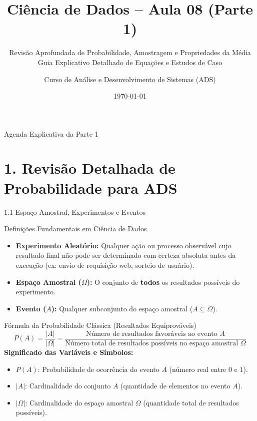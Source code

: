 \documentclass[10pt, aspectratio=169]{beamer}
\title[Ciência de Dados: Probabilidade e Média]{Ciência de Dados -- Aula 08 (Parte 1)}
\subtitle{Revisão Aprofundada de Probabilidade, Amostragem e Propriedades da Média\\{\small Guia Explicativo Detalhado de Equações e Estudos de Caso}}
\author[ADS]{Curso de Análise e Desenvolvimento de Sistemas (ADS)}
\institute[ADS]{Disciplina: Ciência de Dados}
\date{\today}
\begin{document}
\begin{frame}
    \titlepage
\end{frame}

\begin{frame}{Agenda Explicativa da Parte 1}
    \tableofcontents
\end{frame}

\section{1. Revisão Detalhada de Probabilidade para ADS}

\begin{frame}{1.1 Espaço Amostral, Experimentos e Eventos}
    \begin{block}{Definições Fundamentais em Ciência de Dados}
        \begin{itemize}
            \item \textbf{Experimento Aleatório:} Qualquer ação ou processo observável cujo resultado final não pode ser determinado com certeza absoluta antes da execução (ex: envio de requisição web, sorteio de usuário).
            \item \textbf{Espaço Amostral ($\Omega$):} O conjunto de \textbf{todos} os resultados possíveis do experimento.
            \item \textbf{Evento ($A$):} Qualquer subconjunto do espaço amostral ($A \subseteq \Omega$).
        \end{itemize}
    \end{block}

    \vspace{0.2cm}

    \begin{exampleblock}{Fórmula da Probabilidade Clássica (Resultados Equiprováveis)}
        \[ P(A) = \frac{|A|}{|\Omega|} = \frac{\text{Número de resultados favoráveis ao evento } A}{\text{Número total de resultados possíveis no espaço amostral } \Omega} \]
        \textbf{Significado das Variáveis e Símbolos:}
        \begin{itemize}
            \item $P(A)$: Probabilidade de ocorrência do evento $A$ (número real entre $0$ e $1$).
            \item $|A|$: Cardinalidade do conjunto $A$ (quantidade de elementos no evento $A$).
            \item $|\Omega|$: Cardinalidade do espaço amostral $\Omega$ (quantidade total de resultados possíveis).
        \end{itemize}
    \end{exampleblock}
\end{frame}
\end{document}
